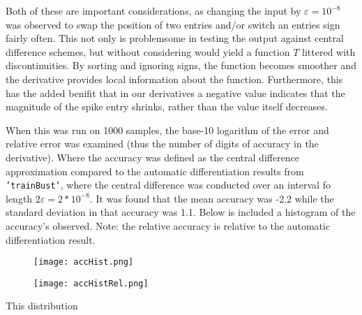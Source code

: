 \documentclass{article}
\newcommand{\tb}{\texttt{'trainBust'}}
\newcommand{\e}{\varepsilon}
\begin{document}
Both of these are important considerations, as changing the input by $\e = 10^{-8}$
was observed to swap the position of two entries and/or switch an entries sign fairly often.
This not only is problemsome in testing the output against central difference schemes, 
but without considering would yield a function $T$ littered with discontinuities.
By sorting and ignoring signs, the function becomes smoother and the derivative provides local
information about the function.
Furthermore, this has the added benifit that in our derivatives a negative value indicates
that the magnitude of the spike entry shrinks, rather than the value itself decreases.


When this was run on 1000 samples, the base-10 logarithm of the error and relative error was examined
(thus the number of digits of accuracy in the derivative).
Where the accuracy was defined as the central difference approximation compared to the
automatic differentiation results from \tb, where the central difference was conducted
over an interval fo length $2\e = 2*10^{-8}$.
It was found that the mean accuracy was -2.2 while the standard deviation in that accuracy was 1.1.
Below is included a histogram of the accuracy's observed.
Note: the relative accuracy is relative to the automatic differentiation result.

\begin{figure}[h!]
  \begin{minipage}[b]{.5\textwidth}
    \centering
    \texttt{[image: accHist.png]}
  \end{minipage}
  \begin{minipage}[b]{.5\textwidth}
    \centering
    \texttt{[image: accHistRel.png]}
  \end{minipage}
\end{figure}

This distribution 
\end{document}
